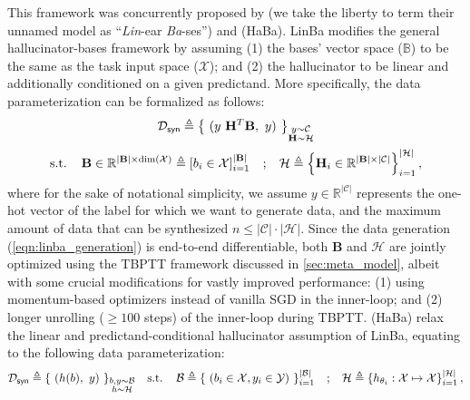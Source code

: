 \documentclass[10pt]{article} %
\begin{document}
This framework was concurrently proposed by \citet{remember_past} (we take the liberty to term their unnamed model as ``\emph{Lin}-ear \emph{Ba}-ses'') and \citet{haba} (HaBa). LinBa modifies the general hallucinator-bases framework by assuming (1) the bases' vector space ($\mathbb{B}$) to be the same as the task input space ($\mathcal{X}$); and (2) the hallucinator to be linear and additionally conditioned on a given predictand. More specifically, the data parameterization can be formalized as follows:
\begin{equation} \label{eqn:linba_generation}
\begin{gathered}
    \distill \triangleq \left\{ ~ (y \ \mathbf{H}^T\mathbf{B}, ~y) ~ \right\}_{\raisebox{6pt}{$\substack{y \sim \mathcal{C}\\\mathbf{H} \sim \mathcal{H}}$}} \\
    \text{s.t.} \hspace{0.4cm}
    \mathbf{B} \in \mathbb{R}^{|\mathbf{B}| \times \dim(\mathcal{X})} \triangleq \left[ b_i \in \mathcal{X} \right]_{i=1}^{|\mathbf{B}|}
    \hspace{0.3cm} ; \hspace{0.3cm} 
    \mathcal{H} \triangleq \left\{ \mathbf{H}_i \in \mathbb{R}^{|\mathbf{B}| \times |\mathcal{C}|} \right\}_{i=1}^{|\mathcal{H}|},
\end{gathered}
\end{equation}
where for the sake of notational simplicity, we assume $y \in \mathbb{R}^{|\mathcal{C}|}$ represents the one-hot vector of the label for which we want to generate data, and the maximum amount of data that can be synthesized $n \leq |\mathcal{C}|\cdot|\mathcal{H}|$. Since the data generation (\cref{eqn:linba_generation}) is end-to-end differentiable, both $\mathbf{B}$ and $\mathcal{H}$ are jointly optimized using the TBPTT framework discussed in \cref{sec:meta_model}, albeit with some crucial modifications for vastly improved performance: (1) using momentum-based optimizers instead of vanilla SGD in the inner-loop; and (2) longer unrolling ($\geq 100$ steps) of the inner-loop during TBPTT. \citet{haba} (HaBa) relax the linear and predictand-conditional hallucinator assumption of LinBa, equating to the following data parameterization:
\begin{equation} \label{eqn:haba_generation}
\begin{gathered}
    \distill \triangleq \left\{ ~ (h(b), ~y) ~ \right\}_{\raisebox{6pt}{$\substack{b, y \sim \mathcal{B}\\h \sim \mathcal{H}}$}}
    \hspace{0.3cm} \text{s.t.} \hspace{0.4cm}
    \mathcal{B} \triangleq \left\{ ~ (b_i \in \mathcal{X}, y_i \in \mathcal{Y}) ~ \right\}_{i=1}^{|\mathcal{B}|}
    \hspace{0.3cm} ; \hspace{0.3cm} 
    \mathcal{H} \triangleq \left\{ h_{\theta_i} : \mathcal{X} \mapsto \mathcal{X} \right\}_{i=1}^{|\mathcal{H}|},
\end{gathered}
\end{equation}
\end{document}
